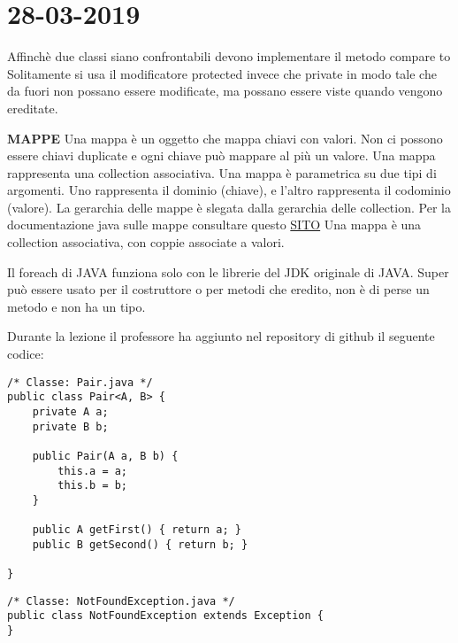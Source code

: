 

\newpage
\section{28-03-2019}
\noindent Affinchè due classi siano confrontabili devono implementare il metodo compare to \newline
Solitamente si usa il modificatore protected invece che private in modo tale che da fuori non possano essere modificate, ma possano essere viste quando vengono ereditate. \newline

\noindent \textbf{MAPPE}\newline
Una mappa è un oggetto che mappa chiavi con valori. Non ci possono essere chiavi duplicate e ogni chiave può mappare al più un valore. \newline
Una mappa rappresenta una collection associativa. \newline
Una mappa è parametrica su due tipi di argomenti. Uno rappresenta il dominio (chiave), e l'altro rappresenta il codominio (valore). La gerarchia delle mappe è slegata dalla gerarchia delle collection. \newline
Per la documentazione java sulle mappe consultare questo \href{https://docs.oracle.com/javase/8/docs/api/java/util/Map.html }{SITO} \newline
Una mappa è una collection associativa, con coppie associate a valori.

\noindent Il foreach di JAVA funziona solo con le librerie del JDK originale di JAVA.\newline
Super può essere usato per il costruttore o per metodi che eredito, non è di perse un metodo e non ha un tipo.

\noindent Durante la lezione il professore ha aggiunto nel repository di github il seguente codice: 


\begin{lstlisting}[basicstyle=\small,]
/* Classe: Pair.java */
public class Pair<A, B> {
    private A a;
    private B b;

    public Pair(A a, B b) {
        this.a = a;
        this.b = b;
    }

    public A getFirst() { return a; }
    public B getSecond() { return b; }

}
\end{lstlisting}

\begin{lstlisting}[basicstyle=\small,]
/* Classe: NotFoundException.java */
public class NotFoundException extends Exception {
}
\end{lstlisting}

